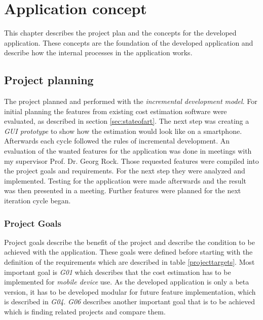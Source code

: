 \chapter{Application concept}

This chapter describes the project plan and the concepts for the developed application. These concepts are the foundation of the developed application and describe how the internal processes in the application works.


\section{Project planning}

The project planned and performed with the \textit{incremental development model}. For initial planning the features from existing cost estimation software were evaluated, as described in section \ref{sec:stateofart}. The next step was creating a \textit{GUI prototype} to show how the estimation would look like on a smartphone. Afterwards each cycle followed the rules of incremental development. An evaluation of the wanted features for the application was done in meetings with my supervisor Prof. Dr. Georg Rock. Those requested features were compiled into the project goals and requirements. For the next step they were analyzed and implemented. Testing for the application were made afterwards and the result was then presented in a meeting. Further features were planned for the next iteration cycle began.


\subsection{Project Goals}\label{objectives}

Project goals describe the benefit of the project and describe the condition to be achieved with the application. These goals were defined before starting with the definition of the requirements which are described in table \ref{projecttargets}. Most important goal is \textit{G01} which describes that the cost estimation has to be implemented for \textit{mobile device} use. As the developed application is only a beta version, it has to be developed modular for future feature implementation, which is described in \textit{G04}. \textit{G06} describes another important goal that is to be achieved which is finding related projects and compare them. \newpage

